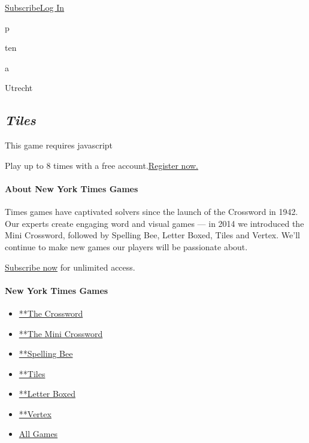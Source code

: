 \href{https://www.nytimes.com/subscription/games?campaignId=4QHQ8}{Subscribe}\href{https://myaccount.nytimes.com/auth/login?redirect_uri=https\%3A\%2F\%2Fwww.nytimes.com\%2Fpuzzles\%2Ftiles\&response_type=cookie\&client_id=games\&application=crosswords\&asset=navigation-bar}{Log
In}

p

ten

a

Utrecht

\hypertarget{tiles}{%
\subsection{\texorpdfstring{\emph{Tiles}}{Tiles}}\label{tiles}}

This game requires javascript

Play up to 8 times with a free
account.\href{https://myaccount.nytimes.com/register?redirect_uri=https\%3A\%2F\%2Fwww.nytimes.com\%2Fpuzzles\%2Ftiles\&response_type=cookie\&client_id=games\&application=crosswords\&asset=tiles-banner}{Register
now.}

\hypertarget{about-new-york-times-games}{%
\paragraph{About New York Times
Games}\label{about-new-york-times-games}}

Times games have captivated solvers since the launch of the Crossword in
1942. Our experts create engaging word and visual games --- in 2014 we
introduced the Mini Crossword, followed by Spelling Bee, Letter Boxed,
Tiles and Vertex. We'll continue to make new games our players will be
passionate about.

\href{https://www.nytimes.com/subscription/games?campaignId=9W9LL}{Subscribe
now} for unlimited access.

\hypertarget{new-york-times-games-1}{%
\paragraph{New York Times Games}\label{new-york-times-games-1}}

\begin{itemize}
\tightlist
\item
  \href{/crosswords/game/daily}{**The Crossword}
\item
  \href{/crosswords/game/mini}{**The Mini Crossword}
\item
  \href{/puzzles/spelling-bee}{**Spelling Bee}
\item
  \href{/puzzles/tiles}{**Tiles}
\item
  \href{/puzzles/letter-boxed}{**Letter Boxed}
\item
  \href{/puzzles/vertex}{**Vertex}
\item
  \href{/crosswords}{All Games}
\end{itemize}


